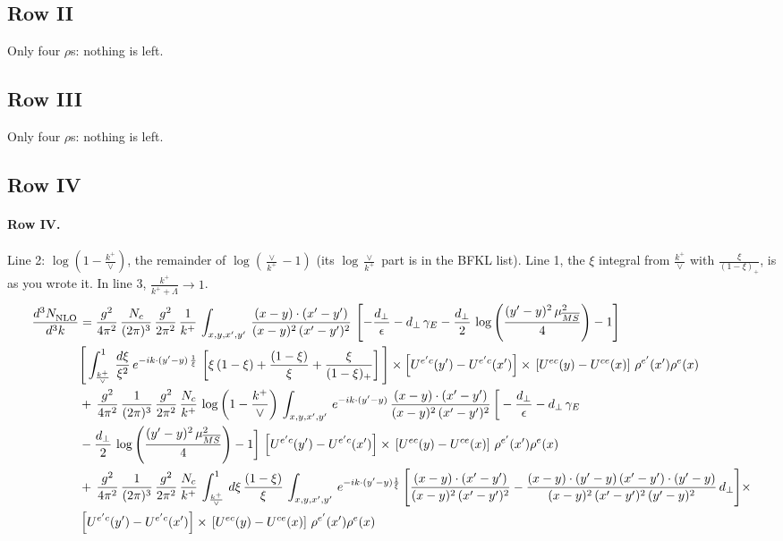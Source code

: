 \documentclass[10pt]{article}
\numberwithin{equation}{section}
\begin{document}
\subsection{Row II}
Only four $\rho$\textquotesingle s: nothing is left.
\subsection{Row III}
Only four $\rho$\textquotesingle s: nothing is left.
\subsection{Row IV}
\paragraph{Row IV.}
Line 2: $\log(1-\frac{k^+}{\vee})$, the remainder of $\log(\frac{\vee}{k^+}-1)$ (its $\log\frac{\vee}{k^+}$ part is in the BFKL list). Line 1, the $\xi$ integral from $\frac{k^+}{\vee}$ with $\frac{\xi}{(1-\xi)_+}$, is as you wrote it. In line 3, $\frac{k^+}{k^++\Lambda}\to1$.
\begin{align}
    \frac{d^{3}N_{\rm NLO}^{\rm}}{d^{3}k}  & =  \frac{g^{2}}{4\pi^{2}}\, \frac{N_{c}}{(2\pi)^{3}}\,\frac{g^{2}}{2\pi^{2}}\, \frac{1}{k^{+}}\,\int_{x,y,x',y'}\,\frac{(x-y)\cdot (x'-y')}{(x-y)^{2}\,(x'-y')^{2}}\,\left[-\frac{d_{\perp}}{\epsilon}-d_{\perp}\,\gamma_{E}-\frac{d_{\perp}}{2}\,\log{\left(\frac{(y'-y)^{2}\,\mu^{2}_{\overline{MS}}}{4}\right)}-1\right]\,\notag \\ & \Bigg[\int_{\frac{k^{+}}{\vee}}^{1}\,\frac{d\xi}{\xi^{2}}\,e^{-ik\cdot (y'-y)\,\frac{1}{\xi}}\,\left[\xi\,(1-\xi)+\frac{(1-\xi)}{\xi}+\frac{\xi}{(1-\xi)_{+}}\right]\Bigg]\times \left[U^{e'c}(y') - U^{e'c}(x')\right] \times\, \left[U^{ec}(y) - U^{ce}(x)\right]\, \rho^{e'}(x') \rho^{e}(x) \notag \\
&  +\, \frac{g^{2}}{4\pi^{2}}\, \frac{1}{(2\pi)^{3}}\,\frac{g^{2}}{2\pi^{2}}\, \frac{N_{c}}{k^{+}}\,\log{\left(1-\frac{k^{+}}{\vee}\right)}\,\int_{x,y,x',y'}\,e^{-ik\cdot (y'-y)}\,\frac{(x-y)\cdot (x'-y')}{(x-y)^{2}\,(x'-y')^{2}}\,\bigg[-\frac{d_{\perp}}{\epsilon}-d_{\perp}\,\gamma_{E}\notag \\ & -\frac{d_{\perp}}{2}\,\log{\left(\frac{(y'-y)^{2}\,\mu^{2}_{\overline{MS}}}{4}\right)}-1\bigg]\,\left[U^{e'c}(y') - U^{e'c}(x')\right] \times\, \left[U^{ec}(y) - U^{ce}(x)\right]\, \rho^{e'}(x') \rho^{e}(x) \notag \\
& +\,\frac{g^{2}}{4\pi^{2}}\, \frac{1}{(2\pi)^{3}}\,\frac{g^{2}}{2\pi^{2}}\, \frac{N_{c}}{k^{+}}\,\int_{\frac{k^{+}}{\vee}}^{1}\,d\xi\, \frac{(1-\xi)}{\xi}\, \int_{x,y,x',y'}\,e^{-ik\cdot (y'-y)\frac{1}{\xi}}\,\Bigg[\frac{(x-y)\cdot (x'-y')}{(x-y)^{2}\, (x'-y')^{2}} -\frac{(x-y)\cdot (y'-y)\, (x'-y')\cdot (y'-y)}{(x-y)^{2}\,(x'-y')^{2}\,(y'-y)^{2}}\,d_{\perp}\Bigg]\times\notag \\ &  \left[U^{e'c}(y') - U^{e'c}(x')\right] \times\, \left[U^{ec}(y) - U^{ce}(x)\right]\, \rho^{e'}(x') \rho^{e}(x) \label{eq:R:G2IV}
\end{align}
\end{document}
